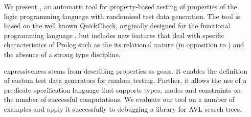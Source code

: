 

We present \plqc{}, an automatic tool for property-based
testing of properties of the logic programming language \Prolog{} with
randomised test data generation.
%
The tool is based on the well known QuickCheck, originally designed
for the functional programming language \Haskell{}, but includes new
features that deal with specific characteristics of Prolog such as the
its relational nature (in opposition to \Haskell{}) and the absence
of a strong type discipline.


\plqc{} expressiveness stems from describing properties as
\Prolog{} goals.
%
It enables the definition of custom test data generators for
random testing.
%
Further, it allows the use of a predicate specification language that
supports types, modes and constraints on the number of successful
computations.
%
We evaluate our tool on a number of  examples and apply
it successfully to debugging a \Prolog{} library for AVL search trees.

